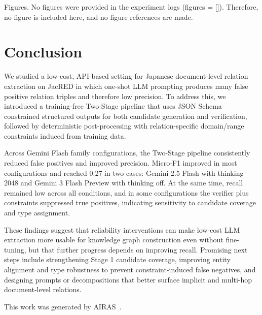 \documentclass{article} %
\begin{document}
Figures. No figures were provided in the experiment logs (figures = []). Therefore, no figure is included here, and no figure references are made.

\section{Conclusion}\label{sec:conclusion}
We studied a low-cost, API-based setting for Japanese document-level relation extraction on JacRED in which one-shot LLM prompting produces many false positive relation triples and therefore low precision. To address this, we introduced a training-free Two-Stage pipeline that uses JSON Schema–constrained structured outputs for both candidate generation and verification, followed by deterministic post-processing with relation-specific domain/range constraints induced from training data.

Across Gemini Flash family configurations, the Two-Stage pipeline consistently reduced false positives and improved precision. Micro-F1 improved in most configurations and reached 0.27 in two cases: Gemini 2.5 Flash with thinking 2048 and Gemini 3 Flash Preview with thinking off. At the same time, recall remained low across all conditions, and in some configurations the verifier plus constraints suppressed true positives, indicating sensitivity to candidate coverage and type assignment.

These findings suggest that reliability interventions can make low-cost LLM extraction more usable for knowledge graph construction even without fine-tuning, but that further progress depends on improving recall. Promising next steps include strengthening Stage 1 candidate coverage, improving entity alignment and type robustness to prevent constraint-induced false negatives, and designing prompts or decompositions that better surface implicit and multi-hop document-level relations.

This work was generated by \textsc{AIRAS}~\citep{airas2025}.



\end{document}
